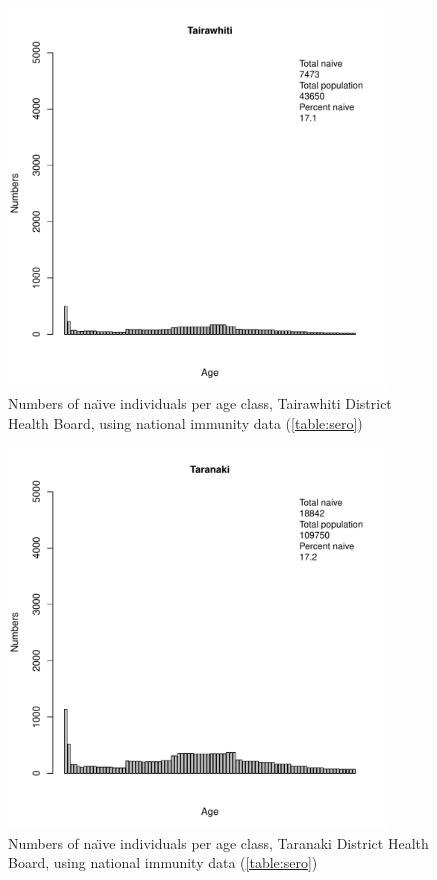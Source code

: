 \documentclass{article}
\begin{document}
\begin{figure}[H]
     \begin{center}
     \includegraphics[width=0.9\textwidth]{dhb8.pdf}
     \end{center}
     \caption{Numbers of na\"{\i}ve individuals per age class, Tairawhiti District Health Board, using national immunity data (\autoref{table:sero})}
     \label{fig:Tairawhiti}
\end{figure}

\begin{figure}[H]
  \begin{center}
    \includegraphics[width=0.9\textwidth]{dhb9.pdf}
     \end{center}
     \caption{Numbers of na\"{\i}ve individuals per age class, Taranaki District Health Board, using national immunity data (\autoref{table:sero})}
     \label{fig:Taranaki}
\end{figure}
\end{document}
